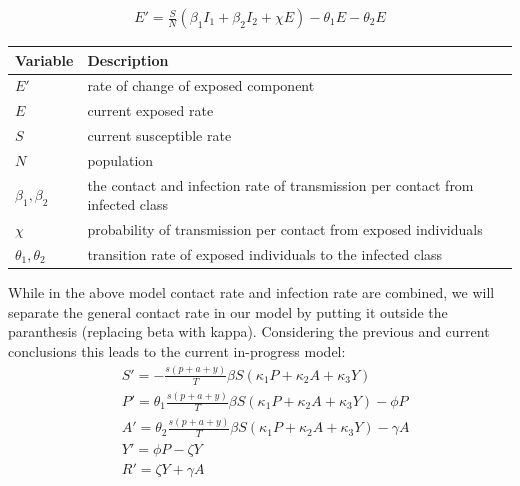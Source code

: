 \documentclass{article}
\begin{document}
\begin{align*}
	E' = \frac{S}{N} (\beta _1 I_1 + \beta _2 I_2 + \chi E) - \theta _1 E - \theta _2 E
\end{align*}

\begin{tabular}{|l | l |}
	\hline
	Variable                 & Description                                                                    \\ [0.5ex]
	\hline\hline
	$E'$                     & rate of change of exposed component                                            \\
	\hline
	$E$                      & current exposed rate                                                           \\
	\hline
	$S$                      & current susceptible rate                                                       \\
	\hline
	$N$                      & population                                                                     \\
	\hline
	$\beta _1 , \beta _2 $   & the contact and infection rate of transmission per contact from infected class \\
	\hline
	$\chi$                   & probability of transmission per contact from exposed individuals               \\
	\hline
	$\theta _1 , \theta _2 $ & transition rate of exposed individuals to the infected class                   \\
	\hline
\end{tabular}
\cite{dynamic}

While in the above model contact rate and infection rate are combined, we will separate the general contact rate in our model by putting it outside the paranthesis (replacing beta with kappa). Considering the previous and current conclusions this leads to the current in-progress model:
\begin{align*}
	 & S' = - \frac{s(p+a+y)}{T} \beta S (\kappa _1 P + \kappa _2 A + \kappa _3 Y)                     \\
	 & P' = \theta _ 1 \frac{s(p+a+y)}{T} \beta S (\kappa _1 P + \kappa _2 A + \kappa _3 Y) - \phi P   \\
	 & A' = \theta _ 2 \frac{s(p+a+y)}{T} \beta S (\kappa _1 P + \kappa _2 A + \kappa _3 Y) - \gamma A \\
	 & Y' = \phi P - \zeta Y                                                                           \\
	 & R' = \zeta Y + \gamma A
\end{align*}
\end{document}
